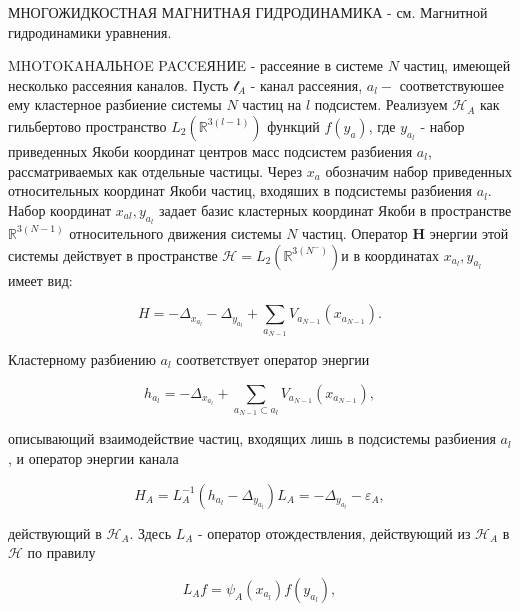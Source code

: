 \documentclass[10pt]{article}
\begin{document}
МНОГОЖИДКОСТНАЯ МАГНИТНАЯ ГИДРОДИНАМИКА - см. Магнитной гидродинамики уравнения.



MHOTOKAHАЛЬHOE PACCEЯHИE - рассеяние в системе $N$ частиц, имеющей несколько рассеяния каналов. Пусть $\mathscr{t}_{A}$ - канал рассеяния, $a_{l}-$ соответствуюшее ему кластерное разбиение системы $N$ частиц на $l$ подсистем. Реализуем $\mathscr{H}_{A}$ как гильбертово пространство $L_{2}\left(\mathbb{R}^{3(l-1)}\right)$ функций $f\left(y_{a}\right)$, где $y_{a_{l}}$ - набор приведенных Якоби координат центров масс подсистем разбиения $a_{l}$, рассматриваемых как отдельные частицы. Через $x_{a}$ обозначим набор приведенных относительных координат Якоби частиц, входяших в подсистемы разбиения $a_{l}$. Набор координат $x_{a l}, y_{a_{l}}$ задает базис кластерных координат Якоби в пространстве $\mathbb{R}^{3(N-1)}$ относительного движения системы $N$ частиц. Оператор $\boldsymbol{H}$ энергии этой системы действует в пространстве $\mathscr{H}=L_{2}\left(\mathbb{R}^{3\left(N^{-}\right)}\right)$и в координатах $x_{a_{l}}, y_{a_{l}}$ имеет вид:



\[

H=-\Delta_{x_{a_{l}}}-\Delta_{y_{a_{l}}}+\sum_{a_{N-1}} V_{a_{N-1}}\left(x_{a_{N-1}}\right) .

\]



Кластерному разбиению $a_{l}$ соответствует оператор энергии



\[

h_{a_{l}}=-\Delta_{x_{a_{l}}}+\sum_{a_{N-1} \subset a_{l}} V_{a_{N-1}}\left(x_{a_{N-1}}\right),

\]



описывающий взаимодействие частиц, входящих лишь в подсистемы разбиения $a_{l}$, и оператор энергии канала



\[

H_{A}=L_{A}^{-1}\left(h_{a_{l}}-\Delta_{y_{a_{l}}}\right) L_{A}=-\Delta_{y_{a_{l}}}-\varepsilon_{A},

\]



действующий в $\mathscr{H}_{A}$. Здесь $L_{A}$ - оператор отождествления, действующий из $\mathscr{H}_{A}$ в $\mathscr{H}$ по правилу



\[

L_{A} f=\psi_{A}\left(x_{a_{l}}\right) f\left(y_{a_{l}}\right),

\]
\end{document}
